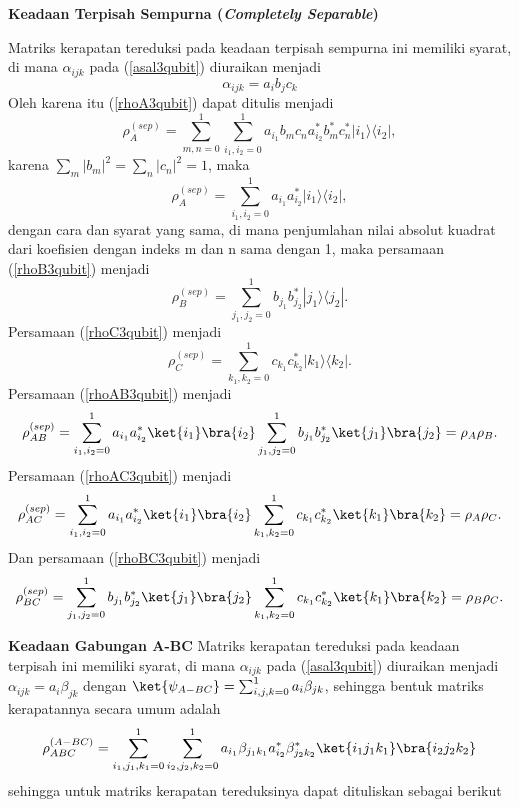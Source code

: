 \textbf{Keadaan Terpisah Sempurna (\textit{Completely Separable})}
\par
Matriks kerapatan tereduksi pada keadaan terpisah sempurna ini memiliki syarat, di mana $\alpha_{ijk}$ pada (\ref{asal3qubit}) diuraikan menjadi
\begin{equation}
	\alpha_{ijk}=a_ib_jc_k
\end{equation}
Oleh karena itu (\ref{rhoA3qubit}) dapat ditulis menjadi
\begin{equation}
\rho_{A}^{(sep)} = \sum_{m,n=0}^{1} \sum_{i_1,i_2=0}^{1}a_{i_1}b_m c_n a^{*}_{i_2}b^{*}_m c^{*}_n|i_1\rangle \langle i_2|,
\end{equation}
karena $\sum_{m}|b_m|^2=\sum_{n}|c_n|^2=1$, maka
\begin{equation}
	\rho_{A}^{(sep)} = \sum_{i_1,i_2=0}^{1}a_{i_1} a^{*}_{i_2}|i_1\rangle \langle i_2|,
\end{equation}
dengan cara dan syarat yang sama, di mana penjumlahan nilai absolut kuadrat dari koefisien dengan indeks m dan n sama dengan 1, maka persamaan (\ref{rhoB3qubit}) menjadi
\begin{equation}
\rho_{B}^{(sep)} = \sum_{j_1,j_2=0}^{1} b_{j_1}b^{*}_{j_2}|j_1\rangle \langle j_2|.
\end{equation}
Persamaan (\ref{rhoC3qubit}) menjadi
\begin{equation}
\rho_{C}^{(sep)} = \sum_{k_1,k_2=0}^{1} c_{k_1}c^{*}_{k_2}|k_1\rangle \langle k_2|.
\end{equation}
Persamaan (\ref{rhoAB3qubit}) menjadi
\begin{equation}
\rho_{AB}^{(sep)} = \sum_{i_1,i_2=0}^{1}a_{i_1}a^{*}_{i_2}\ket{i_1}\bra{i_2}\sum_{j_1,j_2=0}^{1}b_{j_1} b^{*}_{j_2}\ket{j_1}\bra{j_2}=\rho_A\rho_B.
\end{equation}
Persamaan (\ref{rhoAC3qubit}) menjadi
\begin{equation}
\rho_{AC}^{(sep)} = \sum_{i_1,i_2=0}^{1}a_{i_1}a^{*}_{i_2}\ket{i_1}\bra{i_2} \sum_{k_1,k_2=0}^{1}c_{k_1} c^{*}_{k_2}\ket{k_1}\bra{k_2}=\rho_A\rho_C.
\end{equation}
Dan persamaan (\ref{rhoBC3qubit}) menjadi
\begin{equation}
\rho_{BC}^{(sep)} = \sum_{j_1,j_2=0}^{1} b_{j_1}b^{*}_{j_2} \ket{j_1}\bra{j_2} \sum_{k_1,k_2=0}^{1}  c_{k_1}c^{*}_{k_2}\ket{k_1}\bra{k_2}=\rho_B\rho_C.
\end{equation}


\textbf{Keadaan Gabungan A-BC}
Matriks kerapatan tereduksi pada keadaan terpisah ini memiliki syarat, di mana $\alpha_{ijk}$ pada (\ref{asal3qubit}) diuraikan menjadi $\alpha_{ijk}=a_i\beta_{jk}$ dengan $\ket{\psi_{A-BC}}=\sum_{i,j,k=0}^1 a_i\beta_{jk}$, sehingga bentuk matriks kerapatannya secara umum adalah
\begin{equation}
    \rho_{ABC}^{(A-BC)}=\sum_{i_1,j_1,k_1=0}^1\sum_{i_2,j_2,k_2=0}^1 a_{i_1}\beta_{j_1k_1} a^{*}_{i_2}\beta^{*}_{j_2k_2}\ket{i_1j_1k_1}\bra{i_2j_2k_2}
\end{equation}
sehingga untuk matriks kerapatan tereduksinya dapat dituliskan sebagai berikut

